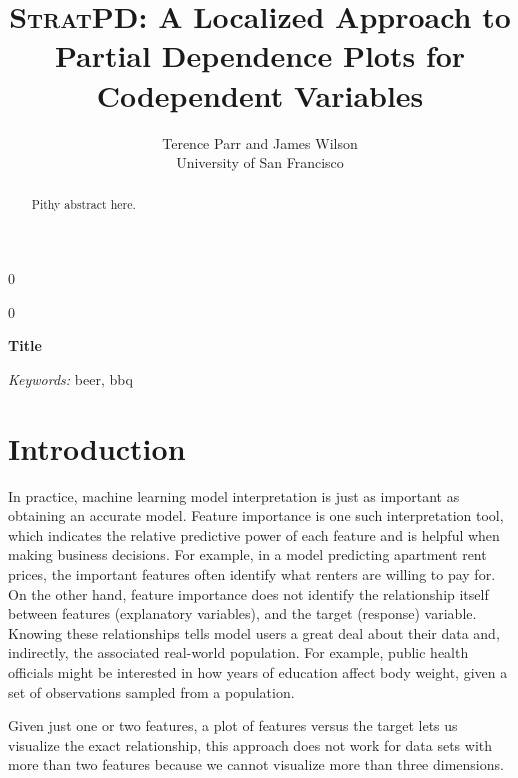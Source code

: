 \documentclass[12pt]{article}
\newcommand{\blind}{0}
\begin{document}
\def\spacingset#1{\renewcommand{\baselinestretch}%
{#1}\small\normalsize} \spacingset{1}



\blind
{
  \title{{\textsc{StratPD}}: \bf A Localized Approach to Partial Dependence Plots for Codependent Variables}

  \author{Terence Parr and James Wilson\\
      University of San Francisco\\
}
  \maketitle
} \fi

\blind
{
  \bigskip
  \bigskip
  \bigskip
  \begin{center}
    {\LARGE\bf Title}
\end{center}
  \medskip
} \fi

\bigskip
\begin{abstract}
Pithy abstract here.
\end{abstract}

\noindent%
{\it Keywords:} beer, bbq

\section{Introduction}
\label{sec:intro}

In practice, machine learning model interpretation is just as important as obtaining an accurate model. Feature importance is one such interpretation tool, which indicates the relative predictive power of each feature and is helpful when making business decisions. For example, in a model predicting apartment rent prices, the important features often identify what renters are willing to pay for. On the other hand, feature importance does not identify the relationship itself between features (explanatory variables),  and the target (response) variable.  Knowing these relationships tells model users a great deal about their data and, indirectly, the associated real-world population. For example, public health officials might be interested in how years of education affect body weight, given a set of observations sampled from a population.

Given just one or two features, a plot of features versus the target lets us visualize the exact relationship, this approach does not work for data sets with more than two features because we cannot visualize more than three dimensions.
\end{document}
